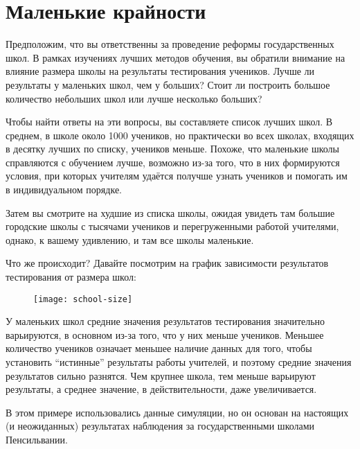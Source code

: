 \section{Маленькие крайности}
\label{chp7:littleextremes}

Предположим, что вы ответственны за проведение реформы государственных школ. В рамках изучениях лучших методов обучения, вы обратили внимание на влияние размера школы на результаты тестирования учеников. Лучше ли результаты у маленьких школ, чем у больших? Стоит ли построить большое количество небольших школ или лучше несколько больших?   

Чтобы найти ответы на эти вопросы, вы составляете список лучших школ. В среднем, в школе около 1000 учеников, но практически во всех школах, входящих в десятку лучших по списку, учеников меньше. Похоже, что маленькие школы справляются с обучением лучше, возможно из-за того, что в них формируются условия, при которых учителям удаётся получше узнать учеников и помогать им в индивидуальном порядке.

Затем вы смотрите на худшие из списка школы, ожидая увидеть там большие городские школы с тысячами учеников и перегруженными работой учителями, однако, к вашему удивлению, и там все школы маленькие. 

Что же происходит? Давайте посмотрим на график зависимости результатов тестирования от размера школ:



\begin{figure}[h!]
    \centering
    \texttt{[image: school-size]}
    \label{fig9:school-size}
\end{figure}

У маленьких школ средние значения результатов тестирования значительно варьируются, в основном из-за того, что у них меньше учеников. Меньшее количество учеников означает меньшее наличие данных для того, чтобы установить ``истинные'' результаты работы учителей, и поэтому средние значения результатов сильно разнятся. Чем крупнее школа, тем меньше варьируют результаты, а среднее значение, в действительности, даже увеличивается.  

В этом примере использовались данные симуляции, но он основан на настоящих (и неожиданных) результатах наблюдения за государственными школами Пенсильвании. \cite{wainer_most_2007}


